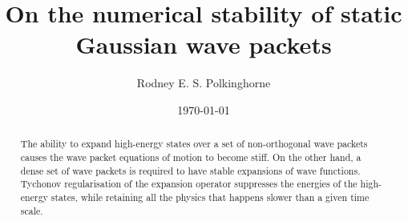 \documentclass[aip,jcp,graphicx,draft]{revtex4-1}
\begin{document}

\title{On the numerical stability of static Gaussian wave packets} %



\author{Rodney E. S. Polkinghorne}


\date{\today}

\begin{abstract}
The ability to expand high-energy states over a set of non-orthogonal wave packets causes the wave packet equations of motion to become stiff.  On the other hand, a dense set of wave packets is required to have stable expansions of wave functions.  Tychonov regularisation of the expansion operator suppresses the energies of the high-energy states, while retaining all the physics that happens slower than a given time scale.
\end{abstract}

\pacs{}%

\maketitle %

\end{document}
